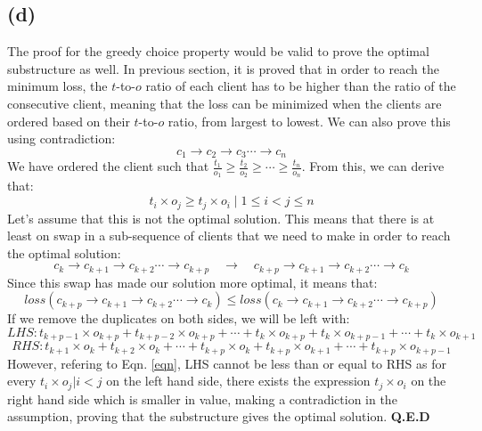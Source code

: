     \subsection{(d)}
    The proof for the greedy choice property would be valid to prove the optimal substructure as well. In previous section, it is proved that
    in order to reach the minimum loss, the $t$-to-$o$ ratio of each client has to be higher than the ratio of the consecutive client, meaning
    that the loss can be minimized when the clients are ordered based on their $t$-to-$o$ ratio, from largest to lowest. We can also prove this
    using contradiction:
    \[ c_1 \rightarrow c_2 \rightarrow c_3 \cdots \rightarrow c_n \]
    We have ordered the client such that $\frac{t_1}{o_1} \geq \frac{t_2}{o_2} \geq \cdots \geq \frac{t_n}{o_n}$. From this, we can derive that:
    \begin{equation} \label{eqn}
    t_i \times o_j \geq t_j \times o_i \; | \; 1 \leq i < j \leq n
    \end{equation}
    Let's assume that this is not the optimal solution. This means that there is at least on swap in a sub-sequence of clients that we need to make
    in order to reach the optimal solution:
    \[ c_k \rightarrow c_{k+1} \rightarrow c_{k+2} \cdots \rightarrow c_{k+p} \quad \rightarrow \quad
    c_{k+p} \rightarrow c_{k+1} \rightarrow c_{k+2} \cdots \rightarrow c_{k} \]
    Since this swap has made our solution more optimal, it means that:
    \[ loss(c_{k+p} \rightarrow c_{k+1} \rightarrow c_{k+2} \cdots \rightarrow c_{k}) \leq loss(c_{k} \rightarrow c_{k+1} \rightarrow c_{k+2} \cdots \rightarrow c_{k+p}) \]
    If we remove the duplicates on both sides, we will be left with:
    \[ LHS: t_{k+p-1} \times o_{k+p} + t_{k+p-2} \times o_{k+p} + \cdots + t_{k} \times o_{k+p} + t_{k} \times o_{k+p-1} + \cdots + t_{k} \times o_{k+1} \]
    \[ RHS: t_{k+1} \times o_{k} + t_{k+2} \times o_{k} + \cdots + t_{k+p} \times o_{k} + t_{k+p} \times o_{k+1} + \cdots + t_{k+p} \times o_{k+p-1} \]
    However, refering to Eqn. \ref{eqn}, LHS cannot be less than or equal to RHS as for every $t_i \times o_j | i<j$ on the left hand side, there exists the expression
    $t_j \times o_i$ on the right hand side which is smaller in value, making a contradiction in the assumption, proving that the substructure gives the
    optimal solution. \textbf{Q.E.D}